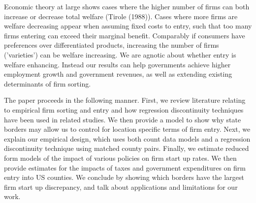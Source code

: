 Economic theory at large shows cases where the higher number of firms can both increase or decrease total welfare (Tirole (1988)). Cases where more firms are welfare decreasing appear when assuming fixed costs to entry, such that too many firms entering can exceed their marginal benefit. Comparably if consumers have preferences over differentiated products, increasing the number of firms ('varieties') can be welfare increasing. We are agnotic about whether entry is welfare enhancing. Instead our results can help governments achieve higher employment growth and government revenues, as well as extending existing determinants of firm sorting.

The paper proceeds in the following manner. First, we review literature relating to empirical firm sorting and entry and how regression discontinuity techniques have been used in related studies. We then provide a model to show why state borders may allow us to control for location specific terms of firm entry. Next, we explain our empirical design, which uses both count data models  and a regression discontinuity technique using matched county pairs. Finally, we estimate reduced form models of the impact of various policies on firm start up rates. We then provide estimates for the impacts of taxes and government expenditures on firm entry into US counties. We conclude by showing which borders have the largest firm start up discrepancy, and talk about applications and limitations for our work.